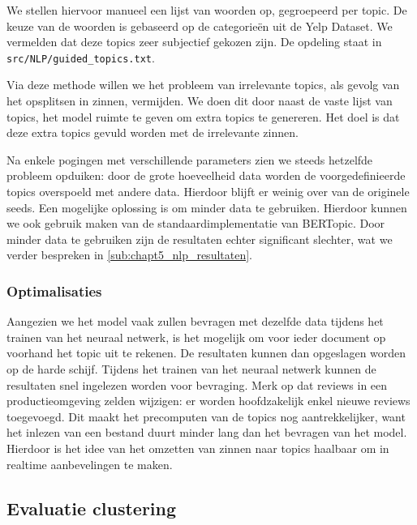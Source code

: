 We stellen hiervoor manueel een lijst van woorden op, gegroepeerd per topic. De keuze van de woorden is gebaseerd op de categorieën uit de Yelp Dataset. We vermelden dat deze topics zeer subjectief gekozen zijn. De opdeling staat in \verb|src/NLP/guided_topics.txt|.

Via deze methode willen we het probleem van irrelevante topics, als gevolg van het opsplitsen in zinnen, vermijden. We doen dit door naast de vaste lijst van topics, het model ruimte te geven om extra topics te genereren. Het doel is dat deze extra topics gevuld worden met de irrelevante zinnen.

Na enkele pogingen met verschillende parameters zien we steeds hetzelfde probleem opduiken: door de grote hoeveelheid data worden de voorgedefinieerde topics overspoeld met andere data. Hierdoor blijft er weinig over van de originele seeds. Een mogelijke oplossing is om minder data te gebruiken. Hierdoor kunnen we ook gebruik maken van de standaardimplementatie van BERTopic. Door minder data te gebruiken zijn de resultaten echter significant slechter, wat we verder bespreken in \autoref{sub:chapt5_nlp_resultaten}.

\subsubsection{Optimalisaties}
Aangezien we het model vaak zullen bevragen met dezelfde data tijdens het trainen van het neuraal netwerk, is het mogelijk om voor ieder document op voorhand het topic uit te rekenen. De resultaten kunnen dan opgeslagen worden op de harde schijf. Tijdens het trainen van het neuraal netwerk kunnen de resultaten snel ingelezen worden voor bevraging. Merk op dat reviews in een productieomgeving zelden wijzigen: er worden hoofdzakelijk enkel nieuwe reviews toegevoegd. Dit maakt het precomputen van de topics nog aantrekkelijker, want het inlezen van een bestand duurt minder lang dan het bevragen van het model. Hierdoor is het idee van het omzetten van zinnen naar topics haalbaar om in realtime aanbevelingen te maken.

\subsection{Evaluatie clustering}
\label{sub:chapt4_eval_clustering}


